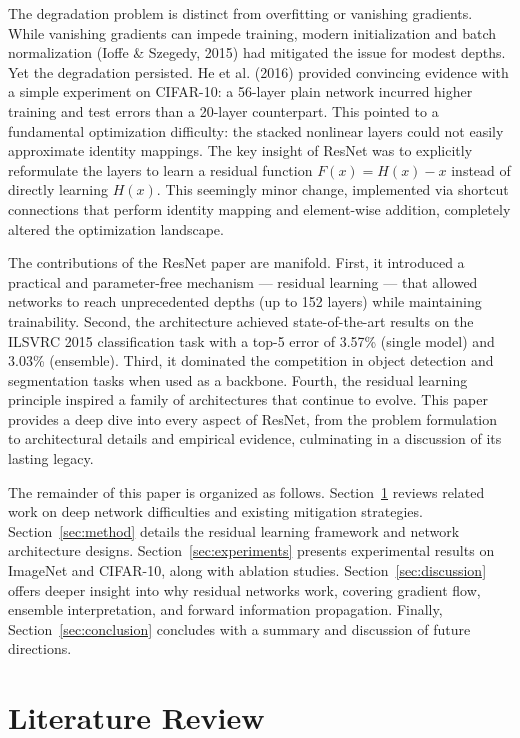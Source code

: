 \documentclass[11pt,a4paper]{article}
\begin{document}
The degradation problem is distinct from overfitting or vanishing gradients. While vanishing gradients can impede training, modern initialization and batch normalization (Ioffe \& Szegedy, 2015) had mitigated the issue for modest depths. Yet the degradation persisted. He et al. (2016) provided convincing evidence with a simple experiment on CIFAR-10: a 56-layer plain network incurred higher training and test errors than a 20-layer counterpart. This pointed to a fundamental optimization difficulty: the stacked nonlinear layers could not easily approximate identity mappings. The key insight of ResNet was to explicitly reformulate the layers to learn a residual function $F(x) = H(x) - x$ instead of directly learning $H(x)$. This seemingly minor change, implemented via shortcut connections that perform identity mapping and element-wise addition, completely altered the optimization landscape.

The contributions of the ResNet paper are manifold. First, it introduced a practical and parameter-free mechanism — residual learning — that allowed networks to reach unprecedented depths (up to 152 layers) while maintaining trainability. Second, the architecture achieved state-of-the-art results on the ILSVRC 2015 classification task with a top-5 error of 3.57\% (single model) and 3.03\% (ensemble). Third, it dominated the competition in object detection and segmentation tasks when used as a backbone. Fourth, the residual learning principle inspired a family of architectures that continue to evolve. This paper provides a deep dive into every aspect of ResNet, from the problem formulation to architectural details and empirical evidence, culminating in a discussion of its lasting legacy.

The remainder of this paper is organized as follows. Section~\ref{sec:litreview} reviews related work on deep network difficulties and existing mitigation strategies. Section~\ref{sec:method} details the residual learning framework and network architecture designs. Section~\ref{sec:experiments} presents experimental results on ImageNet and CIFAR-10, along with ablation studies. Section~\ref{sec:discussion} offers deeper insight into why residual networks work, covering gradient flow, ensemble interpretation, and forward information propagation. Finally, Section~\ref{sec:conclusion} concludes with a summary and discussion of future directions.

\section{Literature Review}
\label{sec:litreview}
\end{document}
